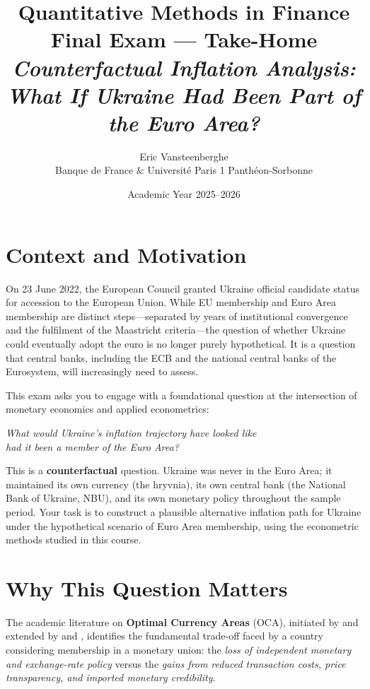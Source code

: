 \documentclass[11pt,a4paper]{article}
\title{%
  \vspace{-1.5cm}
  {\large Quantitative Methods in Finance}\\[0.3em]
  {\Large\bfseries Final Exam --- Take-Home}\\[0.3em]
  {\large\itshape Counterfactual Inflation Analysis:\\
   What If Ukraine Had Been Part of the Euro Area?}
}
\author{%
  Eric Vansteenberghe\\[0.2em]
  \small Banque de France \& Universit\'{e} Paris 1 Panth\'{e}on-Sorbonne
}
\date{Academic Year 2025--2026}
\begin{document}
\maketitle
\thispagestyle{fancy}

\section*{Context and Motivation}

On 23 June 2022, the European Council granted Ukraine official candidate status
for accession to the European Union. While EU membership and Euro Area
membership are distinct steps---separated by years of institutional convergence
and the fulfilment of the Maastricht criteria---the question of whether Ukraine
could eventually adopt the euro is no longer purely hypothetical. It is a
question that central banks, including the ECB and the national central banks of
the Eurosystem, will increasingly need to assess.

This exam asks you to engage with a foundational question at the intersection of
monetary economics and applied econometrics:

\begin{center}
\itshape
What would Ukraine's inflation trajectory have looked like\\
had it been a member of the Euro Area?
\end{center}

This is a \textbf{counterfactual} question. Ukraine was never in the Euro Area;
it maintained its own currency (the hryvnia), its own central bank (the National
Bank of Ukraine, NBU), and its own monetary policy throughout the sample period.
Your task is to construct a plausible alternative inflation path for Ukraine
under the hypothetical scenario of Euro Area membership, using the econometric
methods studied in this course.

\section*{Why This Question Matters}

The academic literature on \textbf{Optimal Currency Areas} (OCA), initiated by
\citet{mundell1961} and extended by \citet{mckinnon1963} and \citet{kenen1969},
identifies the fundamental trade-off faced by a country considering membership in
a monetary union: the \emph{loss of independent monetary and exchange-rate
policy} versus the \emph{gains from reduced transaction costs, price
transparency, and imported monetary credibility}.
\end{document}
